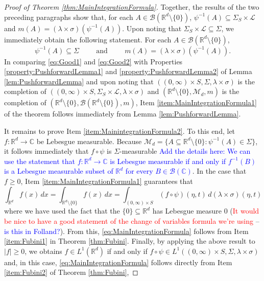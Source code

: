\documentclass[11pt]{article}
\theoremstyle{theorem}
\begin{document}
\begin{proof}[Proof of Theorem \ref{thm:MainIntegrationFormula}]
Together, the results of the two preceding paragraphs show that, for each $A\in\mathcal{B}(\mathbb{R}^d\setminus\{0\})$, $\psi^{-1}(A)\subseteq \Sigma_S\times\mathcal{L}$ and $m(A)=(\lambda\times\sigma)(\psi^{-1}(A))$. Upon noting that $\Sigma_S\times\mathcal{L}\subseteq \Sigma$, we immediately obtain the following statement. For each $A\in\mathcal{B}(\mathbb{R}^d\setminus\{0\})$,
\begin{equation}\label{eq:Good2}
\psi^{-1}(A)\subseteq \Sigma\hspace{1cm}\mbox{and}\hspace{1cm}m(A)=(\lambda\times\sigma)(\psi^{-1}(A)).
\end{equation}
In comparing \eqref{eq:Good1} and \eqref{eq:Good2} with Properties \ref{property:PushforwardLemma1} and \ref{property:PushforwardLemma2} of Lemma \ref{lem:PushforwardLemma} and upon noting that $((0,\infty)\times S,\Sigma,\lambda\times\sigma)$ is the completion of $((0,\infty)\times S,\Sigma_S\times\mathcal{L},\lambda\times\sigma)$ and $(\mathbb{R}^d\setminus\{0\},\mathcal{M}_d,m)$ is the completion of $(\mathbb{R}^d\setminus\{0\},\mathcal{B}(\mathbb{R}^d\setminus\{0\}),m)$, Item \ref{item:MainIntegrationFormula1} of the theorem follows immediately from Lemma \ref{lem:PushforwardLemma}.

It remains to prove Item \ref{item:MainintegrationFormula2}. To this end, let $f:\mathbb{R}^d\to\mathbb{C}$ be Lebesgue measurable. Because $\mathcal{M}_d=\{A\subseteq \mathbb{R}^d\setminus\{0\}:\psi^{-1}(A)\in\Sigma\}$, it follows immediately that $f\circ\psi$ is $\Sigma$-measurable \textcolor{blue}{Add the details here: We can use the statement that $f:\mathbb{R}^d\to\mathbb{C}$ is Lebesgue measurable if and only if $f^{-1}(B)$ is a Lebesgue measurable subset of $\mathbb{R}^d$ for every $B\in\mathcal{B}(\mathbb{C})$}. In the case that $f\geq 0$, Item \ref{item:MainIntegrationFormula1} guarantees that
\begin{equation*}
\int_{\mathbb{R}^d}f(x)\,dx=\int_{\mathbb{R}^d\setminus \{0\}}f(x)\,dx=\int_{(0,\infty)\times S}(f\circ \psi)(\eta,t) \,d(\lambda\times\sigma)(\eta,t)
\end{equation*}
where we have used the fact that the $\{0\}\subseteq\mathbb{R}^d$ has Lebesgue measure $0$  (\textcolor{red}{It would be nice to have a good statement of the change of variables formula we're using} -- \textcolor{blue}{is this in Folland?}). From this, \eqref{eq:MainIntegrationFormula} follows from Item \ref{item:Fubini1} in Theorem \ref{thm:Fubini}. Finally, by applying the above result to $|f|\geq 0$, we obtains $f\in L^1(\mathbb{R}^d)$ if and only if $f\circ \psi\in L^1((0,\infty)\times S,\Sigma,\lambda\times\sigma)$ and, in this case, \eqref{eq:MainIntegrationFormula} follows directly from Item \ref{item:Fubini2} of Theorem \ref{thm:Fubini},
\end{proof}
\end{document}
